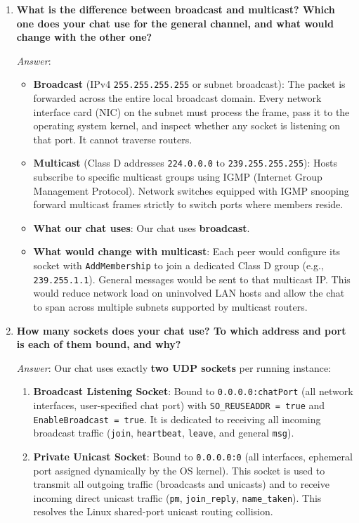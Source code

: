 \documentclass[11pt,a4paper]{article}
\begin{document}
\begin{enumerate}[label=\textbf{Control Question \arabic*:}, leftmargin=*]
    \item \textbf{What is the difference between broadcast and multicast? Which one does your chat use for the general channel, and what would change with the other one?}
    
    \textit{Answer}:
    \begin{itemize}[noitemsep]
        \item \textbf{Broadcast} (IPv4 \texttt{255.255.255.255} or subnet broadcast): The packet is forwarded across the entire local broadcast domain. Every network interface card (NIC) on the subnet must process the frame, pass it to the operating system kernel, and inspect whether any socket is listening on that port. It cannot traverse routers.
        \item \textbf{Multicast} (Class D addresses \texttt{224.0.0.0} to \texttt{239.255.255.255}): Hosts subscribe to specific multicast groups using IGMP (Internet Group Management Protocol). Network switches equipped with IGMP snooping forward multicast frames strictly to switch ports where members reside.
        \item \textbf{What our chat uses}: Our chat uses \textbf{broadcast}.
        \item \textbf{What would change with multicast}: Each peer would configure its socket with \texttt{AddMembership} to join a dedicated Class D group (e.g., \texttt{239.255.1.1}). General messages would be sent to that multicast IP. This would reduce network load on uninvolved LAN hosts and allow the chat to span across multiple subnets supported by multicast routers.
    \end{itemize}

    \item \textbf{How many sockets does your chat use? To which address and port is each of them bound, and why?}
    
    \textit{Answer}: Our chat uses exactly \textbf{two UDP sockets} per running instance:
    \begin{enumerate}
        \item \textbf{Broadcast Listening Socket}: Bound to \texttt{0.0.0.0:chatPort} (all network interfaces, user-specified chat port) with \texttt{SO\_REUSEADDR = true} and \texttt{EnableBroadcast = true}. It is dedicated to receiving all incoming broadcast traffic (\texttt{join}, \texttt{heartbeat}, \texttt{leave}, and general \texttt{msg}).
        \item \textbf{Private Unicast Socket}: Bound to \texttt{0.0.0.0:0} (all interfaces, ephemeral port assigned dynamically by the OS kernel). This socket is used to transmit all outgoing traffic (broadcasts and unicasts) and to receive incoming direct unicast traffic (\texttt{pm}, \texttt{join\_reply}, \texttt{name\_taken}). This resolves the Linux shared-port unicast routing collision.
    \end{enumerate}


\end{enumerate}
\end{document}
